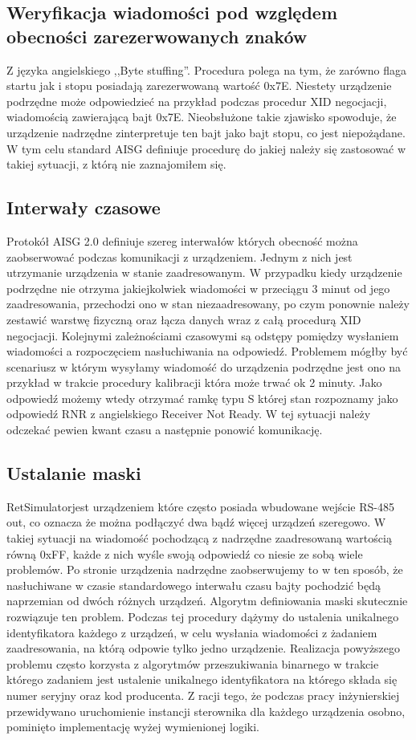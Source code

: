 \subsection{Weryfikacja wiadomości pod względem obecności zarezerwowanych znaków}
    Z języka angielskiego ,,Byte stuffing''. Procedura polega na tym, że zarówno flaga startu jak i stopu posiadają zarezerwowaną wartość 0x7E.
    Niestety urządzenie podrzędne może odpowiedzieć na przykład podczas procedur XID negocjacji, wiadomością zawierającą bajt 0x7E. Nieobsłużone
    takie zjawisko spowoduje, że urządzenie nadrzędne zinterpretuje ten bajt jako bajt stopu, co jest niepożądane. W tym celu standard AISG 
    definiuje procedurę do jakiej należy się zastosować w takiej sytuacji, z którą nie zaznajomiłem się.
\subsection{Interwały czasowe}
    Protokół AISG 2.0 definiuje szereg interwałów których obecność można zaobserwować podczas komunikacji z urządzeniem. Jednym z nich jest
    utrzymanie urządzenia w stanie zaadresowanym. W przypadku kiedy urządzenie podrzędne nie otrzyma jakiejkolwiek wiadomości w przeciągu 3 minut
    od jego zaadresowania, przechodzi ono w stan niezaadresowany, po czym ponownie należy zestawić warstwę fizyczną oraz łącza danych wraz
    z całą procedurą XID negocjacji. Kolejnymi zależnościami czasowymi są odstępy pomiędzy wysłaniem wiadomości a rozpoczęciem nasłuchiwania na odpowiedź.
    Problemem mógłby być scenariusz w którym wysyłamy wiadomość do urządzenia podrzędne jest ono na przykład w trakcie procedury kalibracji która może 
    trwać ok 2 minuty. Jako odpowiedź możemy wtedy otrzymać ramkę typu S której stan rozpoznamy jako odpowiedź RNR z angielskiego Receiver Not Ready. 
    W tej sytuacji należy odczekać pewien kwant czasu a następnie ponowić komunikację.
\subsection{Ustalanie maski}
    RetSimulatorjest urządzeniem które często posiada wbudowane wejście RS-485 out, co oznacza
    że można podłączyć dwa bądź więcej urządzeń szeregowo. W takiej sytuacji na wiadomość pochodzącą z nadrzędne
    zaadresowaną wartością równą 0xFF, każde z nich wyśle swoją odpowiedź co niesie ze sobą wiele problemów.
    Po stronie urządzenia nadrzędne zaobserwujemy to w ten sposób, że nasłuchiwane w czasie standardowego interwału czasu bajty
    pochodzić będą naprzemian od dwóch różnych urządzeń. Algorytm definiowania maski skutecznie rozwiązuje ten problem. 
    Podczas tej procedury dążymy do ustalenia unikalnego identyfikatora każdego z urządzeń, w celu wysłania wiadomości z żadaniem zaadresowania,
    na którą odpowie tylko jedno urządzenie. Realizacja powyższego problemu często korzysta z algorytmów przeszukiwania binarnego w trakcie którego
    zadaniem jest ustalenie unikalnego identyfikatora na którego składa się numer seryjny oraz kod producenta. Z racji tego, że podczas pracy inżynierskiej
    przewidywano uruchomienie instancji sterownika dla każdego urządzenia osobno, pominięto implementację wyżej wymienionej logiki.
